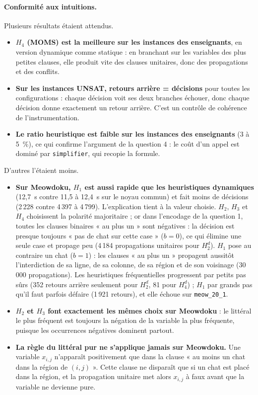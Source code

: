 \documentclass[11pt,a4paper]{article}
\begin{document}
\paragraph{Conformité aux intuitions.} Plusieurs résultats étaient attendus.
\begin{itemize}
  \item \textbf{$H_4$ (MOMS) est la meilleure sur les instances des enseignants}, en version
        dynamique comme statique : en branchant sur les variables des plus petites clauses, elle
        produit vite des clauses unitaires, donc des propagations et des conflits.
  \item \textbf{Sur les instances UNSAT, retours arrière = décisions} pour toutes les
        configurations : chaque décision voit ses deux branches échouer, donc chaque décision
        donne exactement un retour arrière. C'est un contrôle de cohérence de l'instrumentation.
  \item \textbf{Le ratio heuristique est faible sur les instances des enseignants} (3 à 5~\%),
        ce qui confirme l'argument de la question 4 : le coût d'un appel est dominé par
        \texttt{simplifier}, qui recopie la formule.
\end{itemize}
D'autres l'étaient moins.
\begin{itemize}
  \item \textbf{Sur Meowdoku, $H_1$ est aussi rapide que les heuristiques dynamiques}
        (12,7~s contre 11,5 à 12,4~s sur le noyau commun) et fait moins de décisions (2\,228
        contre 4\,397 à 4\,799). L'explication tient à la valeur choisie. $H_2$, $H_3$ et $H_4$
        choisissent la polarité majoritaire ; or dans l'encodage de la question 1, toutes les
        clauses binaires « au plus un » sont négatives : la décision est presque toujours
        « pas de chat sur cette case » ($b=0$), ce qui élimine une seule case et propage peu
        (4\,184 propagations unitaires pour $H_2^d$). $H_1$ pose au contraire un chat ($b=1$) :
        les clauses « au plus un » propagent aussitôt l'interdiction de sa ligne, de sa colonne,
        de sa région et de son voisinage (30\,000 propagations). Les heuristiques fréquentielles
        progressent par petits pas sûrs (352 retours arrière seulement pour $H_2^d$, 81 pour
        $H_4^d$) ; $H_1$ par grands pas qu'il faut parfois défaire (1\,921 retours), et elle
        échoue sur \texttt{meow\_20\_1}.
  \item \textbf{$H_2$ et $H_3$ font exactement les mêmes choix sur Meowdoku} : le littéral le
        plus fréquent est toujours la négation de la variable la plus fréquente, puisque les
        occurrences négatives dominent partout.
  \item \textbf{La règle du littéral pur ne s'applique jamais sur Meowdoku.} Une variable
        $x_{i,j}$ n'apparaît positivement que dans la clause « au moins un chat dans la région
        de $(i,j)$ ». Cette clause ne disparaît que si un chat est placé dans la région, et la
        propagation unitaire met alors $x_{i,j}$ à faux avant que la variable ne devienne pure.
\end{itemize}
\end{document}
